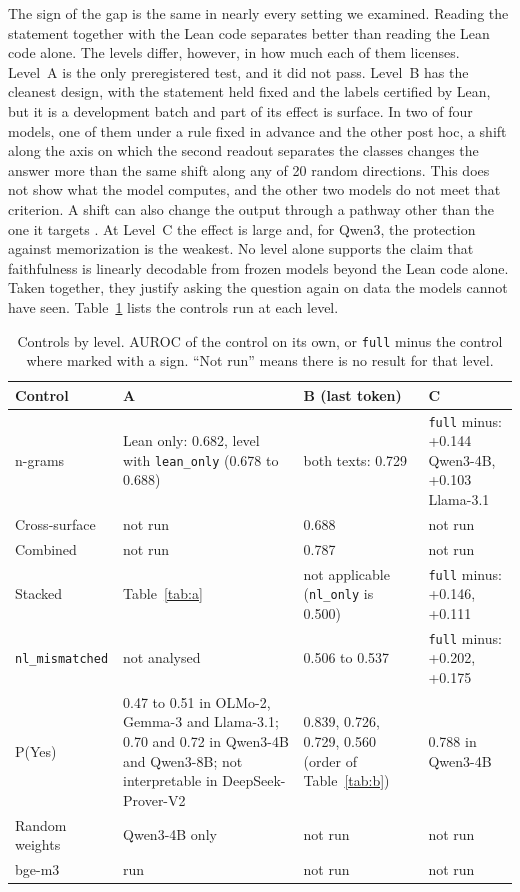 \documentclass[10pt]{article}
\newcommand{\vr}[1]{\texttt{#1}}
\begin{document}
The sign of the gap is the same in nearly every setting we examined. Reading the statement together with the Lean code
separates better than reading the Lean code alone. The levels differ, however, in how much each of them licenses.
Level~A is the only preregistered test, and it did not pass. Level~B has the cleanest design, with the statement
held fixed and the labels certified by Lean, but it is a development batch and part of its effect is surface.
In two of four models, one of them under a rule fixed in advance and the other post hoc, a shift along the axis on which the second readout
separates the classes changes the answer more than the same shift along any of 20 random directions. This does not show what the model computes, and the other two models do not meet that criterion. A shift can also change the output through a pathway other than
the one it targets \citep{makelov2024subspace}. At
Level~C the effect is large and, for Qwen3, the protection against memorization is the weakest. No level alone
supports the claim that faithfulness is linearly decodable from frozen models beyond the Lean code alone.
Taken together, they justify asking the question again on data the models cannot have seen.
Table~\ref{tab:controlesnivel} lists the controls run at each level.

\begin{table}[h]
\centering
\caption{Controls by level. AUROC of the control on its own, or \vr{full} minus the control where marked with a sign. ``Not run'' means there is no result for that level.}
\label{tab:controlesnivel}
\vspace{2pt}
{\small
\begin{tabularx}{\linewidth}{@{}lXXX@{}}
\toprule
Control & A & B (last token) & C\\
\midrule
n-grams & Lean only: 0.682, level with \vr{lean\_only} (0.678 to 0.688) & both texts: 0.729 & \vr{full} minus: +0.144 Qwen3-4B, +0.103 Llama-3.1\\
Cross-surface & not run & 0.688 & not run\\

Combined & not run & 0.787 & not run\\
Stacked & Table~\ref{tab:a} & not applicable (\vr{nl\_only} is 0.500) & \vr{full} minus: +0.146, +0.111\\
\vr{nl\_mismatched} & not analysed & 0.506 to 0.537 & \vr{full} minus: +0.202, +0.175\\
P(Yes) & 0.47 to 0.51 in OLMo-2, Gemma-3 and Llama-3.1; 0.70 and 0.72 in Qwen3-4B and Qwen3-8B; not interpretable in DeepSeek-Prover-V2 & 0.839, 0.726, 0.729, 0.560 (order of Table~\ref{tab:b}) & 0.788 in Qwen3-4B\\
Random weights & Qwen3-4B only & not run & not run\\
bge-m3 & run & not run & not run\\
\bottomrule
\end{tabularx}}
\end{table}
\end{document}
